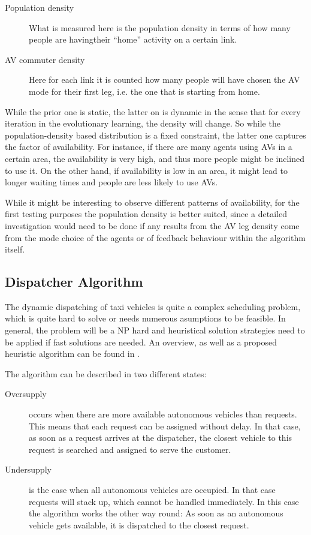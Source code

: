 \begin{description}
\item[Population density] What is measured here is the population density in terms of
how many people are havingtheir ``home'' activity on a certain link.
\item[AV commuter density] Here for each link it is counted how many people will
have chosen the AV mode for their first leg, i.e. the one that is starting from home.
\end{description}

While the prior one is static, the latter on is dynamic in the sense that for every
iteration in the evolutionary learning, the density will change. So while the
population-density based distribution is a fixed constraint, the latter one captures
the factor of availability. For instance, if there are many agents using AVs in a
certain area, the availability is very high, and thus more people might be inclined
to use it. On the other hand, if availability is low in an area, it might lead to
longer waiting times and people are less likely to use AVs.

While it might be interesting to observe different patterns of availability,
for the first testing purposes the population density is better suited, since a
detailed investigation would need to be done if any results from the AV leg density
come from the mode choice of the agents or of feedback behaviour within the algorithm
itself.

\subsection{Dispatcher Algorithm}

The dynamic dispatching of taxi vehicles is quite a complex scheduling problem,
which is quite hard to solve or needs numerous asumptions to be feasible. In
general, the problem will be a NP hard and heuristical solution strategies need
to be applied if fast solutions are needed. An overview, as well as a proposed
heuristic algorithm can be found in \citet{Maciejewski2015, Bischoff2016}.

The algorithm can be described in two different states:

\begin{description}
\item[Oversupply] occurs when there are more available autonomous vehicles than
requests. This means that each request can be assigned without delay. In that case,
as soon as a request arrives at the dispatcher, the closest vehicle to this request
is searched and assigned to serve the customer.
\item[Undersupply] is the case when all autonomous vehicles are occupied. In that
case requests will stack up, which cannot be handled immediately. In this case the
algorithm works the other way round: As soon as an autonomous vehicle gets available,
it is dispatched to the closest request.
\end{description}


